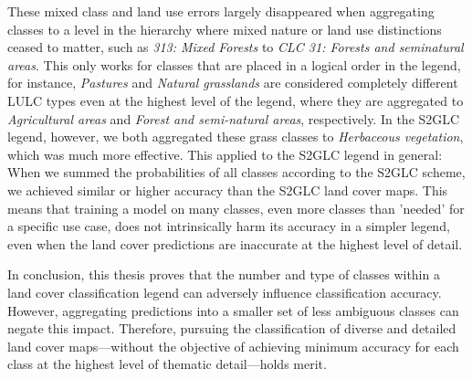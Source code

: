             These mixed class and land use errors largely disappeared when aggregating classes to a level in the hierarchy where mixed nature or land use distinctions ceased to matter, such as \textit{313: Mixed Forests} to \textit{CLC 31: Forests and seminatural areas}. This only works for classes that are placed in a logical order in the legend, for instance, \textit{Pastures} and \textit{Natural grasslands} are considered completely different LULC types even at the highest level of the legend, where they are aggregated to \textit{Agricultural areas} and \textit{Forest and semi-natural areas}, respectively. In the S2GLC legend, however, we both aggregated these grass classes to \textit{Herbaceous vegetation}, which was much more effective. This applied to the S2GLC legend in general: When we summed the probabilities of all classes according to the S2GLC scheme, we achieved similar or higher accuracy than the S2GLC land cover maps. This means that training a model on many classes, even more classes than 'needed' for a specific use case, does not intrinsically harm its accuracy in a simpler legend, even when the land cover predictions are inaccurate at the highest level of detail.

        In conclusion, this thesis proves that the number and type of classes within a land cover classification legend can adversely influence classification accuracy. However, aggregating predictions into a smaller set of less ambiguous classes can negate this impact. Therefore, pursuing the classification of diverse and detailed land cover maps---without the objective of achieving minimum accuracy for each class at the highest level of thematic detail---holds merit.
    
